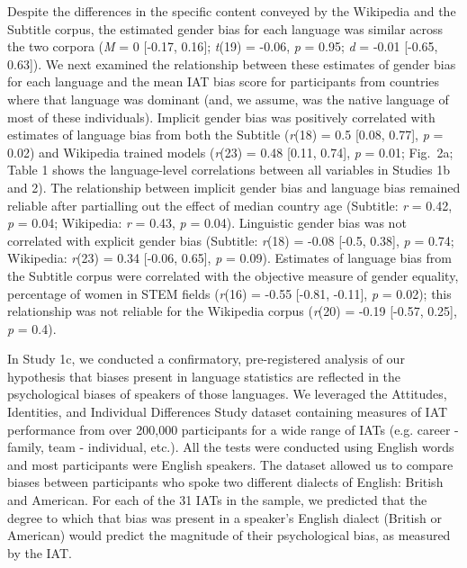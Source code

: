 \documentclass[9pt,twocolumn,twoside,lineno]{pnas-new}
\begin{document}
Despite the differences in the specific content conveyed by the
Wikipedia and the Subtitle corpus, the estimated gender bias for each
language was similar across the two corpora (\emph{M} = 0 {[}-0.17, 0.16{]}; \emph{t}(19) = -0.06, \emph{p} = 0.95; \emph{d} = -0.01 {[}-0.65, 0.63{]}). We next examined the relationship between these
estimates of gender bias for each language and the mean IAT bias score
for participants from countries where that language was dominant (and,
we assume, was the native language of most of these individuals).
Implicit gender bias was positively correlated with estimates of
language bias from both the Subtitle (\emph{r}(18) = 0.5 {[}0.08, 0.77{]}, \emph{p} = 0.02)
and Wikipedia trained models (\emph{r}(23) = 0.48 {[}0.11, 0.74{]}, \emph{p} = 0.01; Fig.\ 2a;
Table 1 shows the language-level correlations between all variables in
Studies 1b and 2). The relationship between implicit gender bias and
language bias remained reliable after partialling out the effect of
median country age (Subtitle: \emph{r} = 0.42, \emph{p} = 0.04; Wikipedia: \emph{r} = 0.43, \emph{p} = 0.04). Linguistic gender bias was
not correlated with explicit gender bias (Subtitle: \emph{r}(18) = -0.08 {[}-0.5, 0.38{]}, \emph{p} = 0.74; Wikipedia: \emph{r}(23) = 0.34 {[}-0.06, 0.65{]}, \emph{p} = 0.09). Estimates
of language bias from the Subtitle corpus were correlated with the
objective measure of gender equality, percentage of women in STEM fields
(\emph{r}(16) = -0.55 {[}-0.81, -0.11{]}, \emph{p} = 0.02); this relationship was not reliable
for the Wikipedia corpus (\emph{r}(20) = -0.19 {[}-0.57, 0.25{]}, \emph{p} = 0.4).


In Study 1c, we conducted a confirmatory, pre-registered analysis of our hypothesis that biases present in language statistics are reflected in the psychological biases of speakers of those languages. We leveraged the Attitudes, Identities, and Individual Differences Study dataset \citep[AIID,][]{aiid} containing measures of IAT performance from over 200,000 participants for a wide range of IATs (e.g. career - family, team - individual, etc.). All the tests were conducted using English words and most participants were English speakers. The dataset allowed us to compare biases between participants who spoke two different dialects of English: British and American. For each of the 31 IATs in the sample, we predicted that the degree to which that bias was present in a speaker’s English dialect (British or American) would predict the magnitude of their psychological bias, as measured by the IAT.
\end{document}
